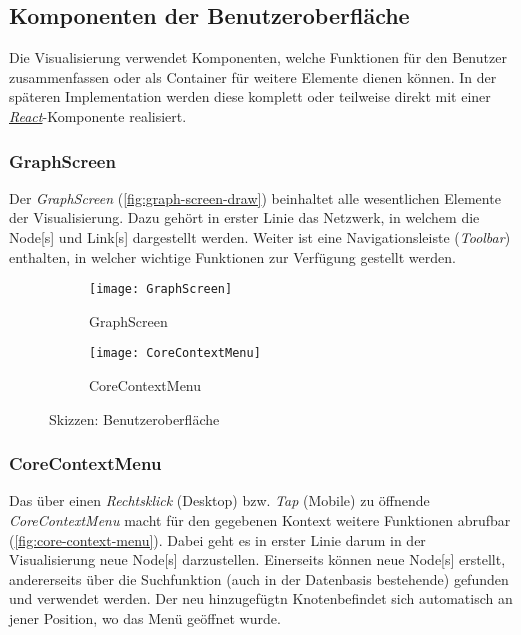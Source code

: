 \subsection{Komponenten der Benutzeroberfläche}\label{komponenten}

Die Visualisierung verwendet Komponenten, welche Funktionen für den Benutzer zusammenfassen oder als Container für weitere Elemente dienen können. In der späteren Implementation werden diese komplett oder teilweise direkt mit einer \hyperref[react]{\textit{React}}-Komponente realisiert.


\subsubsection{GraphScreen}
Der \textit{GraphScreen} (\autoref{fig:graph-screen-draw}) beinhaltet alle wesentlichen Elemente der Visualisierung. Dazu gehört in erster Linie das \gls{Netzwerk}, in welchem die \gls{Node}[s] und \gls{Link}[s] dargestellt werden. Weiter ist eine Navigationsleiste (\textit{Toolbar}) enthalten, in welcher wichtige Funktionen zur Verfügung gestellt werden. 

\begin{figure}[htbp]
    \centering
     \begin{subfigure}[b]{0.4\textwidth}
    \texttt{[image: GraphScreen]}
    \caption{GraphScreen}
    \label{fig:graph-screen-draw}
    \end{subfigure}
    \begin{subfigure}[b]{0.5\textwidth}
    \texttt{[image: CoreContextMenu]}
    \caption{CoreContextMenu}
    \label{fig:core-context-menu}
    \end{subfigure}
    \caption{Skizzen: Benutzeroberfläche}
\end{figure}

\subsubsection{CoreContextMenu}
Das über einen \textit{Rechtsklick} (Desktop) bzw. \textit{Tap} (Mobile) zu öffnende \textit{CoreContextMenu} macht für den gegebenen Kontext weitere Funktionen abrufbar (\autoref{fig:core-context-menu}). Dabei geht es in erster Linie darum in der Visualisierung neue \gls{Node}[s] darzustellen. Einerseits können neue \gls{Node}[s] erstellt, andererseits über die Suchfunktion (auch in der Datenbasis bestehende) gefunden und verwendet werden. Der neu hinzugefügtn Knotenbefindet sich automatisch an jener Position, wo das Menü geöffnet wurde.

